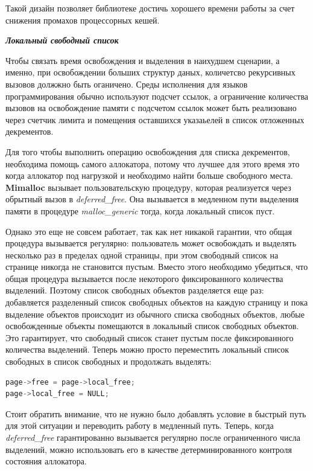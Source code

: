 Такой дизайн позволяет библиотеке достичь хорошего времени работы за счет снижения промахов процессорных кешей.

\bigbreak
\textit{\textbf{Локальный свободный список}}

Чтобы связать время освобождения и выделения в наихудшем сценарии, а именно, при освобождении больших структур даных, количетсво рекурсивных вызовов должжно быть оганичено. Среды исполнения для языков программирования обычно используют подсчет ссылок, а ограничение количества вызовов на освобождение памяти с подсчетом ссылок может быть реализовано через счетчик лимита и помещения оставшихся указаьелей в список отложенных декрементов.

Для того чтобы выполнить операцию освобождения для списка декрементов, необходима помощь самого аллокатора, потому что лучшее для этого время это когда аллокатор под нагрузкой и необходимо найти больше свободного места. \textbf{Mimalloc} вызывает пользовательскую процедуру, которая реализуется через обрытный вызов в \textit{deferred\_free}. Она вызывается в медленном пути выделения памяти в процедуре \textit{malloc\_generic} тогда, когда локальный список пуст.

Однако это еще не совсем работает, так как нет никакой гарантии, что общая процедура вызывается регулярно: пользователь может освобождать и выделять несколько раз в пределах одной страницы, при этом свободный список на странице никогда не становится пустым. Вместо этого необходимо убедиться, что общая процедура вызывается после некоторого фиксированного количества выделений. Поэтому список свободных объектов разделяется еще раз: добавляется разделенный список свободных объектов на каждую страницу и пока выделение объектов происходит из обычного списка свободных объектов, любые освобожденные объекты помещаются в локальный список свободных объектов. Это гарантирует, что свободный список станет пустым после фиксированного количества выделений. Теперь можно просто переместить локальный список свободных в список свободных и продолжать выделять:

\begin{lstlisting}[language=c++,numbers=none]
page->free = page->local_free;
page->local_free = NULL;
\end{lstlisting}

Стоит обратить внимание, что не нужно было добавлять условие в быстрый путь для этой ситуации и переводить работу в медленный путь. Теперь, когда \textit{deferred\_free} гарантированно вызывается регулярно после ограниченного числа выделений, можно использовать его в качестве детерминированного контроля состояния аллокатора.

